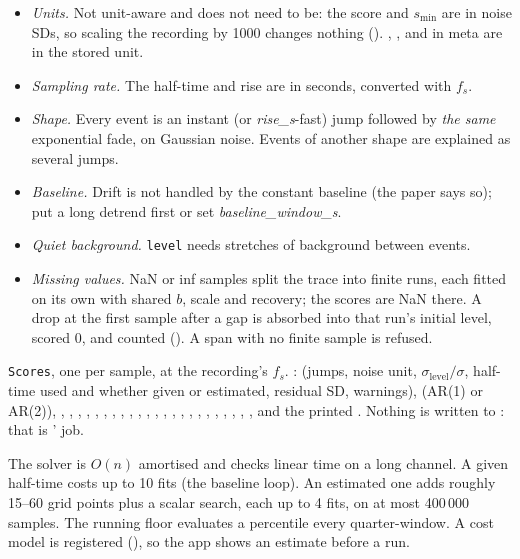 \begin{itemize}
\item \emph{Units.} Not unit-aware and does not need to be: the score and $s_{\min}$ are in
  noise SDs, so scaling the recording by 1000 changes nothing
  (). ,
  ,  and  in meta are in the stored unit.
\item \emph{Sampling rate.} The half-time and rise are in seconds, converted with $f_s$.
\item \emph{Shape.} Every event is an instant (or \emph{rise\_s}-fast) jump followed by
  \emph{the same} exponential fade, on Gaussian noise. Events of another shape are explained
  as several jumps.
\item \emph{Baseline.} Drift is not handled by the constant baseline (the paper says so); put
  a long detrend first or set \emph{baseline\_window\_s}.
\item \emph{Quiet background.} \texttt{level} needs stretches of background between events.
\item \emph{Missing values.} NaN or inf samples split the trace into finite runs, each fitted on
  its own with shared $b$, scale and recovery; the scores are NaN there. A drop at the first
  sample after a gap is absorbed into that run's initial level, scored 0, and counted
  (). A span with no finite sample is refused.
\end{itemize}

\texttt{Scores}, one per sample, at the recording's $f_s$. :  (jumps,
noise unit, $\sigma_\text{level}/\sigma$, half-time used and whether given or estimated,
residual SD, warnings),  (AR(1) or AR(2)), , ,
, , , , ,
, , ,
, , ,
, , , ,
, , , ,
, ,  and the printed .
Nothing is written to : that is ' job.

The solver is $O(n)$ amortised and  checks linear time on a long
channel. A given half-time costs up to 10 fits (the baseline loop). An estimated one adds
roughly 15--60 grid points plus a scalar search, each up to 4 fits, on at most 400\,000
samples. The running floor evaluates a percentile every quarter-window. A cost model is
registered (), so the app shows an estimate before a run.

